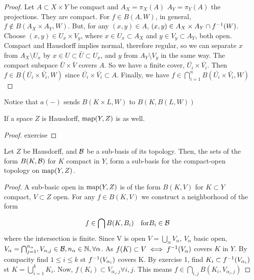 \documentclass[main.tex]{subfiles}
\begin{document}
\begin{proof}
	Let \(A \subset X \times Y\) be compact and \(A_X = \pi_X(A)\) \(A_Y = \pi_Y(A)\) the projections.
	They are compact.
	For \(f \in B(A,W)\), in general, \(f \notin B(A_X \times A_Y, W)\).
	But, for any \((x,y) \in A\), \((x,y) \in A_X \times A_Y \cap f^{-1}(W)\).
	Choose \((x,y) \in U_x \times V_y\), where \(x \in U_x \subset A_X\) and \(y \in V_y \subset A_Y\), both open.
	Compact and Hausdorff implies normal, therefore regular, so we can separate \(x\) from \(A_X \setminus U_x\) by \(x \in U \subset \bar{U} \subset U_x\), and \(y\) from \(A_Y \setminus V_y\) in the same way.
	The compact subspace \(\bar U \times \bar V\) covers \(A\). So we have a finite cover, \(\bar{U_i} \times \bar{V_i}\).
	Then \(f \in B(\bar{U_i} \times \bar{V_i}, W)\) since \(\bar{U_i} \times \bar{V_i} \subset A\).
	Finally, we have \(f \in \bigcap_{i = 1}^n B(\bar{U_i} \times \bar{V_i}, W)\)
\end{proof}

\begin{rem}
	Notice that \(a(-)\) sends \(B(K \times L, W)\) to \(B(K, B(L,W))\)
\end{rem}

\begin{lemma}
	If a space \(Z\) is Hausdorff, \(\operatorname{map}(Y,Z)\) is as well.

\end{lemma}

\begin{proof}
	exercise

\end{proof}

\begin{lemma}
	Let \(Z\) be Hausdorff, and \(\mathcal{B}\) be a sub-basis of its topology.
	Then, the sets of the form \(B(K, \mathcal{B})\) for \(K\) compact in \(Y\), form a sub-basis for the compact-open topology on \(\operatorname{map}(Y,Z)\).
\end{lemma}

\begin{proof}
	A sub-basic open in \(\operatorname{map}(Y,Z)\) is of the form \(B(K,V)\) for \(K \subset Y\) compact, \(V \subset Z\) open.
	For any \(f \in B(K,V)\) we construct a neighborhood of the form

\[
		f \in \bigcap B(K, B_i) \quad \text{for} B_i \in \cB

\]
	where the intersection is finite.
	Since V is open \(V = \bigcup_\alpha V_\alpha\), \(V_\alpha\) basic open,
	\(V_\alpha = \bigcap_{j = 1}^{n_\alpha}, V_{\alpha, j} \in \mathcal{B}, n_\alpha \in \mathbb{N}, \forall \alpha \).
	As \(f(K) \subset V \iff f^{-1}(V_\alpha)\) covers \(K\) in \(Y\).
	By compacity find \(1 \leq i \leq k\) st \(f^{-1}(V_{\alpha_i})\) covers K.
	By exercise 1, find \(K_i \subset f^{-1}(V_{\alpha_i})\) st \(K = \bigcup_{i = 1}^k K_i\).
	Now, \(f(K_i) \subset V_{\alpha_i,j} \forall i,j \).
	This means \(f \in \bigcap_{i,j} B(K_i, V_{\alpha_i, j})\)
\end{proof}
\end{document}

